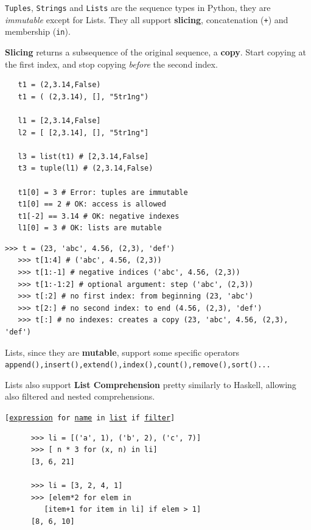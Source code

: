 \begin{paracol}{2}
   \colfill
   \texttt{Tuples}, \texttt{Strings} and \texttt{Lists} are the sequence types in Python, they are \textit{immutable} except for Lists.
   They all support \textbf{slicing}, concatenation (\lstinline|+|) and membership (\lstinline|in|).
   
   \textbf{Slicing} returns a subsequence of the original sequence, a \textbf{copy}.
   Start copying
   at the first index, and stop copying \textit{before} the second index.
   
   \colfill
   \switchcolumn

   \begin{lstlisting}
   t1 = (2,3.14,False) 
   t1 = ( (2,3.14), [], "5tr1ng") 
   
   l1 = [2,3.14,False]
   l2 = [ [2,3.14], [], "5tr1ng"]
   
   l3 = list(t1) # [2,3.14,False]
   t3 = tuple(l1) # (2,3.14,False)
   
   t1[0] = 3 # Error: tuples are immutable
   t1[0] == 2 # OK: access is allowed
   t1[-2] == 3.14 # OK: negative indexes
   l1[0] = 3 # OK: lists are mutable
   \end{lstlisting}
   
\end{paracol}


\begin{lstlisting}[caption={Slicing examples}]
   >>> t = (23, 'abc', 4.56, (2,3), 'def')
   >>> t[1:4] # ('abc', 4.56, (2,3))
   >>> t[1:-1] # negative indices ('abc', 4.56, (2,3))
   >>> t[1:-1:2] # optional argument: step ('abc', (2,3))
   >>> t[:2] # no first index: from beginning (23, 'abc')
   >>> t[2:] # no second index: to end (4.56, (2,3), 'def')
   >>> t[:] # no indexes: creates a copy (23, 'abc', 4.56, (2,3), 'def')
\end{lstlisting}

\begin{paracol}{2}
   \colfill
   Lists, since they are \textbf{mutable}, support some specific operators \lstinline|append(),insert(),extend(),index(),count(),remove(),sort()...| 
   
   Lists also support \textbf{List Comprehension} pretty similarly to Haskell, allowing also filtered and nested comprehensions.
   
   \texttt{[\ul{expression} for \ul{name} in \ul{list} if \ul{filter}]}
   \colfill
   
   \switchcolumn

   \begin{lstlisting}
      >>> li = [('a', 1), ('b', 2), ('c', 7)]
      >>> [ n * 3 for (x, n) in li]
      [3, 6, 21]
      
      >>> li = [3, 2, 4, 1]
      >>> [elem*2 for elem in
         [item+1 for item in li] if elem > 1]
      [8, 6, 10]
   \end{lstlisting}
\end{paracol}

